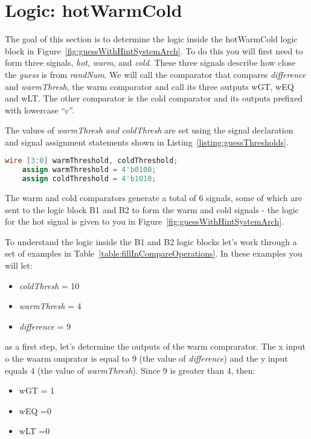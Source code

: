 \section{Logic: hotWarmCold}

The goal of this section is to determine the logic inside the hotWarmCold logic block
in Figure~\ref{fig:guessWithHintSystemArch}.  To do this you will first need to form three 
signals, \emph{hot}, \emph{warm}, and \emph{cold}.  These three signals describe how close the 
\emph{guess} is from \emph{randNum}. We will call the comparator that compares \emph{difference} 
and \emph{warmThresh}, the warm comparator and call its three outputs wGT, wEQ and wLT.
The other comparator is the cold comparator and its outputs prefixed with  lowercase ``c''.

The values of \emph{warmThresh and coldThresh} are set using the signal declaration 
and signal assignment statements shown in Listing~\ref{listing:guessThresholds}.

\begin{lstlisting}[language=Verilog,
 caption={The signal declaration and assignment for guess thresholds.},
 label={listing:guessThresholds},
 frame=single]
    wire [3:0] warmThreshold, coldThreshold; 
    assign warmThreshold = 4'b0100;		
    assign coldThreshold = 4'b1010;
\end{lstlisting}

The warm and cold comparators generate a total of 6 signals, some of which are
sent to the logic block B1 and B2 to form the warm and cold signals - the logic for the
hot signal is given to you in Figure~\ref{fig:guessWithHintSystemArch}.

To understand the logic inside the B1 and B2 logic blocks let's work through a
set of examples in Table~\ref{table:fillInCompareOperations}.  In these examples
you will let:
\begin{itemize}
\item \emph{coldThresh} = 10
\item \emph{warmThresh} = 4
\item \emph{difference} = 9
\end{itemize}

as a first step, let's determine the outputs of the warm comprarator.
The x input o the waarm omprator is equal to 9 (the value of \emph{difference})
and the y input equals 4 (the value of \emph{warmThresh}). Since 9 is
greater than 4, then:
\begin{itemize}
\item wGT = 1
\item wEQ =0
\item wLT =0
\end{itemize}

